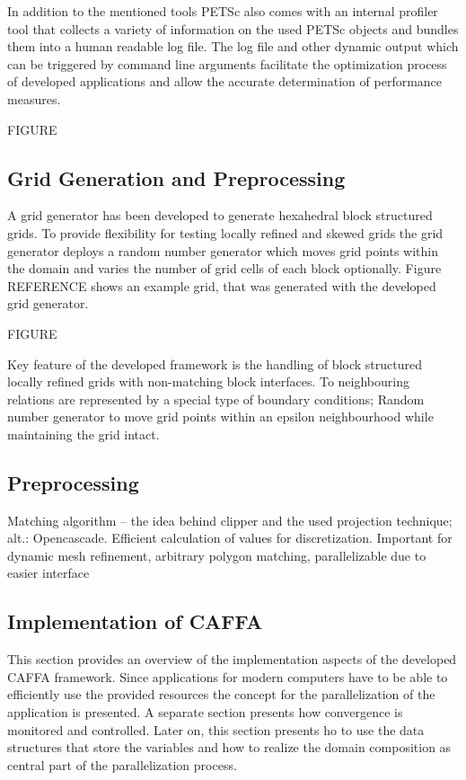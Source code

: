In addition to the mentioned tools PETSc also comes with an internal profiler tool that collects a variety of information on the used PETSc objects and bundles them into a human readable log file. The log file and other dynamic output which can be triggered by command line arguments facilitate the optimization process of developed applications and allow the accurate determination of performance measures.

FIGURE

\subsection{Grid Generation and Preprocessing}

A grid generator has been developed to generate hexahedral block structured grids. To provide flexibility for testing locally refined and skewed grids the grid generator deploys a random number generator which moves grid points within the domain and varies the number of grid cells of each block optionally. Figure REFERENCE shows an example grid, that was generated with the developed grid generator.

FIGURE

Key feature of the developed framework is the handling of block structured locally refined grids with non-matching block interfaces. To neighbouring relations are represented by a special type of boundary conditions; Random number generator to move grid points within an epsilon neighbourhood while maintaining the grid intact. 

\subsection{Preprocessing}
Matching algorithm -- the idea behind clipper and the used projection technique; alt.: Opencascade. Efficient calculation of values for discretization. Important for dynamic mesh refinement, arbitrary polygon matching, parallelizable due to easier interface

\subsection{Implementation of CAFFA}

This section provides an overview of the implementation aspects of the developed CAFFA framework. Since applications for modern computers have to be able to efficiently use the provided resources the concept for the parallelization of the application is presented. A separate section presents how convergence is monitored and controlled. Later on, this section presents ho to use the data structures that store the variables and how to realize the domain composition as central part of the parallelization process.

